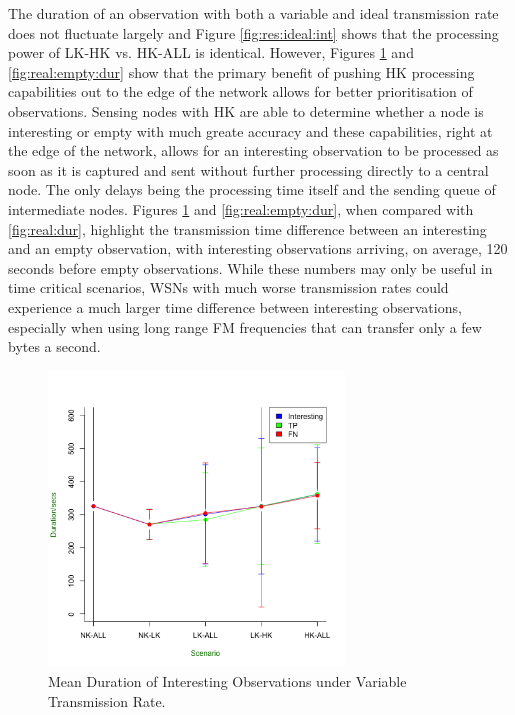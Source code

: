 The duration of an observation with both a variable and ideal transmission rate does not fluctuate largely and Figure \ref{fig:res:ideal:int} shows that the processing power of LK-HK vs. HK-ALL is identical. However, Figures \ref{fig:real:int:dur} and \ref{fig:real:empty:dur} show that the primary benefit of pushing HK processing capabilities out to the edge of the network allows for better prioritisation of observations. Sensing nodes with HK are able to determine whether a node is interesting or empty with much greate accuracy and these capabilities, right at the edge of the network, allows for an interesting observation to be processed as soon as it is captured and sent without further processing directly to a central node. The only delays being the processing time itself and the sending queue of intermediate nodes. Figures \ref{fig:real:int:dur} and \ref{fig:real:empty:dur}, when compared with \ref{fig:real:dur}, highlight the transmission time difference between an interesting and an empty observation, with interesting observations arriving, on average, 120 seconds before empty observations. While these numbers may only be useful in time critical scenarios, WSNs with much worse transmission rates could experience a much larger time difference between interesting observations, especially when using long range FM frequencies that can transfer only a few bytes a second.

    \begin{figure}[h]
	\centering
	\includegraphics[width=0.70\textwidth]{Chap7/figures/real_int_dur}
	\caption{Mean Duration of Interesting Observations under Variable Transmission Rate.}
	\label{fig:real:int:dur}
	\end{figure}	

